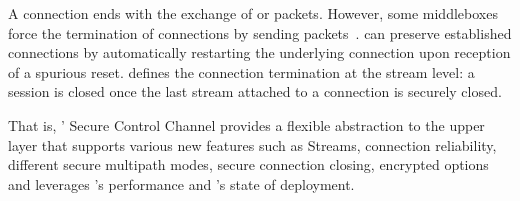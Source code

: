 A \tcp connection ends with the exchange of \fin or \rst packets. However, some
middleboxes force the termination of \tcp connections by sending \rst
packets~\cite{rfc3360,weaver2009detecting}. \tcpls can preserve established
connections by automatically restarting the underlying \tcp connection upon
reception of a spurious reset. \tcpls defines the connection termination at the
stream level: a \tcpls session is closed once the last stream attached to a
\tcp connection is securely closed.

That is, \tcpls' Secure Control Channel provides a flexible abstraction
to the upper layer that supports various new features such as
Streams, connection reliability, different secure multipath modes, secure
connection closing, encrypted \tcp options and leverages \tcp's performance and \tls's state of deployment.


